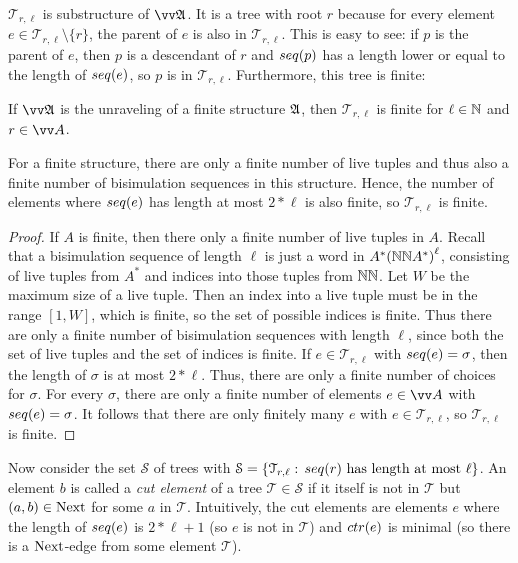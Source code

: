 \noindent
$\mathcal{T}_{r,\ell}$ is substructure of $\unravel{A}$.
It is a tree with root $r$ because for every element $e \in \mathcal{T}_{r,\ell} \setminus \{r\}$, the parent of $e$ is also in $\mathcal{T}_{r,\ell}$.
This is easy to see: if $p$ is the parent of $e$, then $p$ is a descendant of $r$ and $\seq{p}$ has a length lower or equal to the length of $\seq{e}$, so $p$ is in $\mathcal{T}_{r,\ell}$.
Furthermore, this tree is finite:
\begin{lemma}\label{lem:bounded-trees-are-finite}
  If $\unravel{A}$ is the unraveling of a finite structure ${\mathfrak{A}}$, then $\mathcal{T}_{r,\ell}$ is finite for $\ell \in {\mathbb{N}}$ and $r \in \unraveldom{A}$.
\end{lemma}
\begin{proofsketch}
  For a finite structure, there are only a finite number of live tuples and thus also a finite number of bisimulation sequences in this structure.
  Hence, the number of elements where $\seq{e}$ has length at most $2 * \ell$ is also finite, so $\mathcal{T}_{r,\ell}$ is finite.
\end{proofsketch}
\begin{proof}
If $A$ is finite, then there only a finite number of live tuples in $A$.
Recall that a bisimulation sequence of length $\ell$ is just a word in $A^*{({\mathbb{N}}{\mathbb{N}}{}A^{*})}^{\ell}$, consisting of live tuples from $A^{*}$ and indices into those tuples from ${\mathbb{N}}{\mathbb{N}}$.
Let $W$ be the maximum size of a live tuple.
Then an index into a live tuple must be in the range $[1,W]$, which is finite, so the set of possible indices is finite.
Thus there are only a finite number of bisimulation sequences with length $\ell$, since both the set of live tuples and the set of indices is finite.
If $e \in \mathcal{T}_{r,\ell}$ with $\seq{e} = \sigma$, then the length of $\sigma$ is at most $2 * \ell$.
Thus, there are only a finite number of choices for $\sigma$.
For every $\sigma$, there are only a finite number of elements $e \in \unraveldom{A}$ with $\seq{e} = \sigma$.
It follows that there are only finitely many $e$ with $e \in \mathcal{T}_{r,\ell}$, so $\mathcal{T}_{r,\ell}$ is finite.
\end{proof}
Now consider the set $\mathcal{S}$ of trees with $\mathcal{S} = \left\{ \mathcal{T}_{r,\ell}:\, \seq{r}\ \text{has length at most $\ell$}\right\}$.
An element $b$ is called a \emph{cut element} of a tree $\mathcal{T} \in \mathcal{S}$ if it itself is not in $\mathcal{T}$ but $(a,b) \in \mathrm{Next}$ for some $a$ in $\mathcal{T}$.
Intuitively, the cut elements are elements $e$ where the length of $\seq{e}$ is $2 * \ell + 1$ (so $e$ is not in $\mathcal{T}$) and $\ctr{e}$ is minimal (so there is a $\mathrm{Next}$-edge from some element $\mathcal{T}$).
